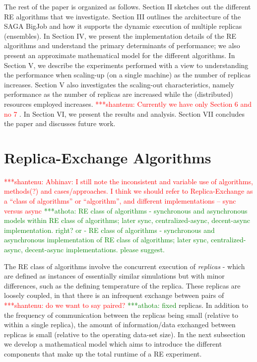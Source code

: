 \documentclass{rspublic}
\newcommand{\jhanote}[1]{ {\textcolor{red} { ***shantenu: #1 }}}
\newcommand{\alnote}[1]{ {\textcolor{blue} { ***andre: #1 }}}
\newcommand{\athotanote}[1]{ {\textcolor{green} { ***athota: #1 }}}
\newcommand{\alnote}[1]{}
\newcommand{\athotanote}[1]{}
\newcommand{\jhanote}[1]{}
\begin{document}
The rest of the paper is organized as follows. Section II sketches out
the different RE algorithms that we investigate. Section III outlines
the architecture of the SAGA BigJob and how it supports the dynamic
execution of multiple replicas (ensembles). In Section IV, we present
the implementation details of the RE algorithms and understand
the primary determinants of performance; we also present
an approximate mathematical model for the different algorithms.
In Section V, we describe the experiments performed with a view to
understanding the performance when scaling-up (on a single machine) as
the number of replicas increases. Section V also investigates the
scaling-out characteristics, namely performance as the number of
replicas are increased while the (distributed) resources employed
increases. %
\jhanote{Currently we have only Section 6 and no 7}. In Section VI, we
present the results and analysis.  Section VII concludes the paper and
discusses future work.


\section{Replica-Exchange Algorithms}
\label{sec:repex-approach}
\jhanote{Abhinav: I still note the inconsistent and variable use of
  algorithms, methods(?) and cases/approaches. I think we should refer
  to Replica-Exchange as a ``class of algorithms'' or ``algorithm'',
  and different implementations -- sync versus async} 
  \athotanote{RE class of algorithms - synchronous and asynchronous models within RE class of algorithms; later sync, centralized-async, decent-async implementation. right? or - RE class of algorithms - synchronous and asynchronous implementation of RE class of algorithms; later sync, centralized-async, decent-async implementations. please suggest.}
  
  The RE class of algorithms 
involve the concurrent execution of \emph{replicas} - which are
defined as instances of essentially similar simulations but with minor
differences, such as the defining temperature of the replica. These
replicas are loosely coupled, in that there is an infrequent exchange
between pairs of \jhanote{do we want to say paired?} \athotanote{fixed} replicas. In
addition to the frequency of communication between the replicas being
small (relative to within a single replica), the amount of
information/data exchanged between replicas is small (relative to the
operating data-set size). In the next subsection we develop a mathematical model which aims to introduce the different components that make up the total runtime of a RE experiment. 
\end{document}
